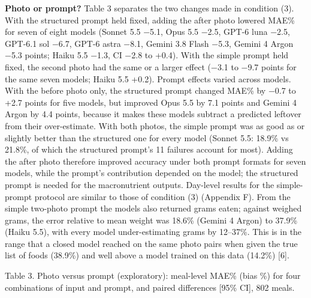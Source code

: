 \documentclass[
  11pt,
  letterpaper]{article}
\begin{document}
\textbf{Photo or prompt?} Table 3 separates the two changes made in condition (3). With the structured prompt
held fixed, adding the after photo lowered MAE\% for seven of eight models (Sonnet 5.5 −5.1, Opus 5.5 −2.5,
GPT-6 luna −2.5, GPT-6.1 sol −6.7, GPT-6 astra −8.1, Gemini 3.8 Flash −5.3, Gemini 4 Argon −5.3 points; Haiku
5.5 −1.3, CI −2.8 to +0.4). With the simple prompt held fixed, the second photo had the same or a larger
effect (−3.1 to −9.7 points for the same seven models; Haiku 5.5 +0.2). Prompt effects varied across models.
With the before photo only, the structured prompt changed MAE\% by −0.7 to +2.7 points for five models, but
improved Opus 5.5 by 7.1 points and Gemini 4 Argon by 4.4 points, because it makes these models subtract a
predicted leftover from their over-estimate. With both photos, the simple prompt was as good as or slightly
better than the structured one for every model (Sonnet 5.5: 18.9\% vs 21.8\%, of which the structured prompt's
11 failures account for most). Adding the after photo therefore improved accuracy under both prompt formats
for seven models, while the prompt's contribution depended on the model; the structured prompt is needed for
the macronutrient outputs. Day-level results for the simple-prompt protocol are similar to those of condition
(3) (Appendix F). From the simple two-photo prompt the models also returned grams eaten; against weighed
grams, the error relative to mean weight was 18.6\% (Gemini 4 Argon) to 37.9\% (Haiku 5.5), with every model
under-estimating grams by 12--37\%. This is in the range that a closed model reached on the same photo pairs
when given the true list of foods (38.9\%) and well above a model trained on this data (14.2\%) {[}6{]}.

Table 3. Photo versus prompt (exploratory): meal-level MAE\% (bias \%) for four combinations of input and
prompt, and paired differences {[}95\% CI{]}, 802 meals.
\end{document}
